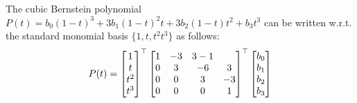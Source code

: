 \documentclass[a4paper]{article}
\begin{document}
\begin{corollary}
    The cubic Bernstein polynomial $P(t) = b_0(1-t)^3 + 3b_1(1-t)^2t + 3b_2(1-t)t^2 + b_3t^3$ can be written w.r.t. the standard monomial basis $\{1,t,t^2t^3\}$ as follows:
\begin{equation}
    P(t) =
    \begin{bmatrix}
        1 \\ t \\ t^2 \\ t^3 
    \end{bmatrix}^{\top}
    \begin{bmatrix}
        1 & -3 & 3 -1 \\
        0 & 3 & -6 & 3 \\
        0 & 0 & 3 & -3 \\ 
        0 & 0 & 0 & 1
    \end{bmatrix}^{\top}
   \begin{bmatrix}
        b_0 \\ b_1 \\ b_2 \\ b_3 
    \end{bmatrix}
\end{equation}
\end{corollary}
\end{document}
